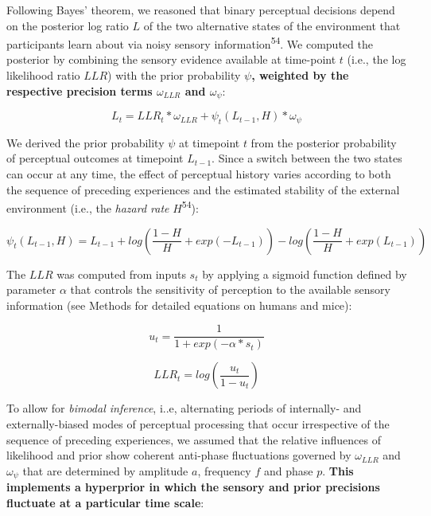 \documentclass[
]{article}
\begin{document}
Following Bayes' theorem, we reasoned that binary perceptual decisions
depend on the posterior log ratio \(L\) of the two alternative states of
the environment that participants learn about via noisy sensory
information\textsuperscript{54}. We computed the posterior by combining
the sensory evidence available at time-point \(t\) (i.e., the log
likelihood ratio \(LLR\)) with the prior probability \(\psi\)\textbf{,
weighted by the respective precision terms \(\omega_{LLR}\) and
\(\omega_{\psi}\)}:

\begin{equation}
L_t = LLR_t * \omega_{LLR} + \psi_t(L_{t-1}, H) * \omega_{\psi}
\end{equation}

We derived the prior probability \(\psi\) at timepoint \(t\) from the
posterior probability of perceptual outcomes at timepoint \(L_{t-1}\).
Since a switch between the two states can occur at any time, the effect
of perceptual history varies according to both the sequence of preceding
experiences and the estimated stability of the external environment
(i.e., the \emph{hazard rate} \(H\)\textsuperscript{54}):

\begin{equation}
\psi_t(L_{t-1}, H)  = L_{t-1} + log(\frac{1-H}{H} + exp(-L_{t-1})) - log(\frac{1-H}{H} + exp(L_{t-1}))
\end{equation}

The \(LLR\) was computed from inputs \(s_t\) by applying a sigmoid
function defined by parameter \(\alpha\) that controls the sensitivity
of perception to the available sensory information (see Methods for
detailed equations on humans and mice):

\begin{equation}
u_t = \frac{1}{1 + exp(-\alpha * s_t)}
\end{equation}

\begin{equation}
LLR_t = log(\frac{u_t}{1-u_t})
\end{equation}

To allow for \emph{bimodal inference}, i..e, alternating periods of
internally- and externally-biased modes of perceptual processing that
occur irrespective of the sequence of preceding experiences, we assumed
that the relative influences of likelihood and prior show coherent
anti-phase fluctuations governed by \(\omega_{LLR}\) and
\(\omega_{\psi}\) that are determined by amplitude \(a\), frequency
\(f\) and phase \(p\). \textbf{This implements a hyperprior in which the
sensory and prior precisions fluctuate at a particular time scale}:
\end{document}
